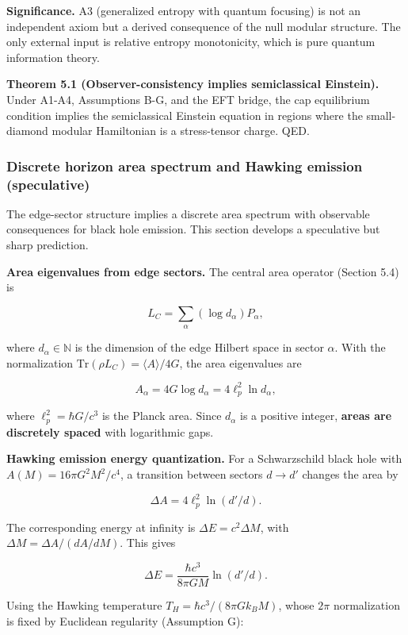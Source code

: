\documentclass[11pt,a4paper]{article}
\theoremstyle{remark}
\begin{document}
\textbf{Significance.} A3 (generalized entropy with
quantum focusing) is not an independent axiom but a derived consequence
of the null modular structure. The only external input is relative entropy
monotonicity, which is pure quantum information theory.

\textbf{Theorem 5.1 (Observer-consistency implies semiclassical Einstein).} Under
A1-A4, Assumptions B-G, and the EFT bridge, the cap equilibrium condition
implies the semiclassical Einstein equation in regions where the
small-diamond modular Hamiltonian is a stress-tensor charge. QED.

\subsubsection{Discrete horizon area spectrum and Hawking emission (speculative)}\label{discrete-horizon-area-spectrum-and-hawking-emission-speculative}

The edge-sector structure implies a discrete area spectrum with observable
consequences for black hole emission. This section develops a speculative but
sharp prediction.

\textbf{Area eigenvalues from edge sectors.} The central area operator (Section 5.4)
is

\[
L_C = \sum_\alpha (\log d_\alpha) P_\alpha,
\]

where \(d_\alpha \in \mathbb{N}\) is the dimension of the edge Hilbert space in
sector \(\alpha\). With the normalization \(\mathrm{Tr}(\rho L_C) = \langle A
\rangle / 4G\), the area eigenvalues are

\[
A_\alpha = 4G \log d_\alpha = 4\ell_p^2 \ln d_\alpha,
\]

where \(\ell_p^2 = \hbar G/c^3\) is the Planck area. Since \(d_\alpha\) is a
positive integer, \textbf{areas are discretely spaced} with logarithmic gaps.

\textbf{Hawking emission energy quantization.} For a Schwarzschild black hole with
\(A(M) = 16\pi G^2 M^2/c^4\), a transition between sectors \(d \to d'\) changes
the area by

\[
\Delta A = 4\ell_p^2 \ln(d'/d).
\]

The corresponding energy at infinity is \(\Delta E = c^2 \Delta M\), with
\(\Delta M = \Delta A / (dA/dM)\). This gives

\[
\Delta E = \frac{\hbar c^3}{8\pi G M} \ln(d'/d).
\]

Using the Hawking temperature \(T_H = \hbar c^3 / (8\pi G k_B M)\), whose
\(2\pi\) normalization is fixed by Euclidean regularity (Assumption G):
\end{document}

